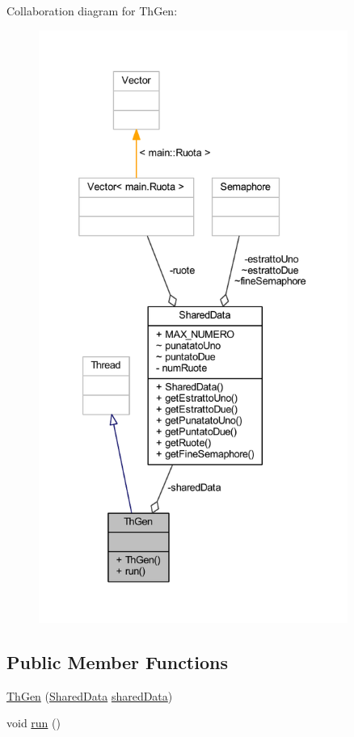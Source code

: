 Collaboration diagram for Th\+Gen\+:
\nopagebreak
\begin{figure}[H]
\begin{center}
\leavevmode
\includegraphics[height=550pt]{classmain_1_1_th_gen__coll__graph}
\end{center}
\end{figure}
\subsection*{Public Member Functions}
\begin{DoxyCompactItemize}
\item 
\mbox{\hyperlink{classmain_1_1_th_gen_ab975ff8819d4ba6b00d6661950d14bb6}{Th\+Gen}} (\mbox{\hyperlink{classmain_1_1_shared_data}{Shared\+Data}} \mbox{\hyperlink{classmain_1_1_th_gen_ac5f1128ef8d0ba91a8214e03732e2662}{shared\+Data}})
\item 
void \mbox{\hyperlink{classmain_1_1_th_gen_a13a43e6d814de94978c515cb084873b1}{run}} ()
\end{DoxyCompactItemize}
